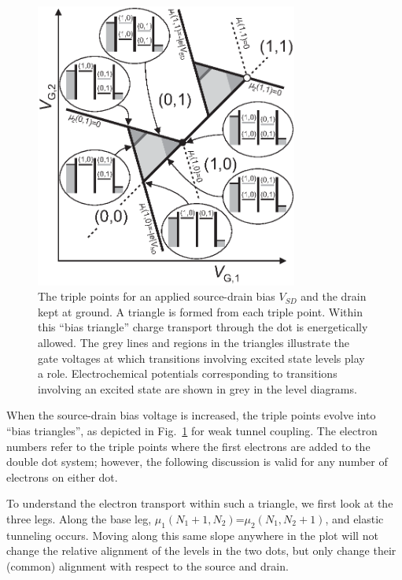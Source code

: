 \documentclass[rmp,twocolumn,aps]{revtex4}
\begin{document}
\begin{figure}[htb]
\includegraphics[width=3.4in, clip=true]{hanson_fig30.eps}
\caption{The triple points for an applied source-drain bias
$V_{SD}$ and the drain kept at ground. A triangle is formed from
each triple point. Within this ``bias triangle'' charge transport
through the dot is energetically allowed. The grey lines and
regions in the triangles illustrate the gate voltages at which
transitions involving excited state levels play a role.
Electrochemical potentials corresponding to transitions involving
an excited state are shown in grey in the level diagrams.}
\label{Fig:DDbiastriangles}
\end{figure}

When the source-drain bias voltage is increased, the triple points
evolve into ``bias triangles'', as depicted in
Fig.~\ref{Fig:DDbiastriangles} for weak tunnel coupling. The
electron numbers refer to the triple points where the first
electrons are added to the double dot system; however, the
following discussion is valid for any number of electrons on
either dot.

To understand the electron transport within such a triangle, we
first look at the three legs. Along the base leg, $\mu_{1}(N_{1}+1,N_{2})$=$\mu _{2}(N_{1},N_{2}+1)$, and elastic
tunneling occurs. Moving along this same slope anywhere in the
plot will not change the relative alignment of the levels in the
two dots, but only change their (common) alignment with respect to
the source and drain.
\end{document}

